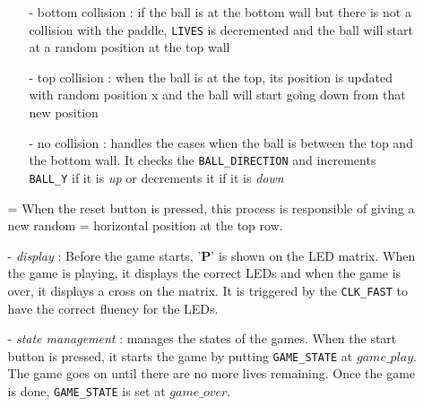 \begin{itemize}
\begin{itemize}
\begin{itemize}
            \item[-] bottom collision : if the ball is at the bottom wall but there is not a collision with the paddle, \texttt{LIVES} is decremented and the ball will start at a random position at the top wall\\

            \item[-] top collision : when the ball is at the top, its position is updated with random position x and the ball will start going down from that new position \\

            \item[-] no collision : handles the cases when the ball is between the top and the bottom wall. It checks the \texttt{BALL\_DIRECTION} and increments \texttt{BALL\_Y} if it is \textit{up} or decrements it if it is \textit{down}
        \end{itemize}
        
        \hangindent= {} When the reset button is pressed, this process is responsible of giving a new random \hangindent= {} horizontal position at the top row.
        
        \item[-] \textit{display} : Before the game starts, '\textbf{P}' is shown on the LED matrix. When the game is playing, it displays the correct LEDs and when the game is over, it displays a cross on the matrix. It is triggered by the \texttt{CLK\_FAST} to have the correct fluency for the LEDs.\\

        \item[-] \textit{state management} : manages the states of the games. When the start button is pressed, it starts the game by putting \texttt{GAME\_STATE} at $game\_play$. The game goes on until there are no more lives remaining. Once the game is done,  \texttt{GAME\_STATE} is set at $game\_over$. 
    \end{itemize}
\end{itemize}
